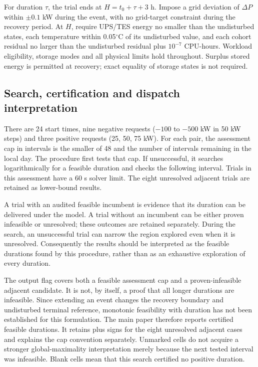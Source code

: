 For duration $\tau$, the trial ends at $H=t_0+\tau+3$ h. Impose a grid deviation of $\Delta P$ within $\pm0.1$ kW during the event, with no grid-target constraint during the recovery period. At $H$, require UPS/TES energy no smaller than the undisturbed states, each temperature within 0.05$^{\circ}$C of its undisturbed value, and each cohort residual no larger than the undisturbed residual plus $10^{-7}$ CPU-hours. Workload eligibility, storage modes and all physical limits hold throughout. Surplus stored energy is permitted at recovery; exact equality of storage states is not required.

\subsection{Search, certification and dispatch interpretation}
There are 24 start times, nine negative requests ($-100$ to $-500$ kW in 50 kW steps) and three positive requests (25, 50, 75 kW). For each pair, the assessment cap in intervals is the smaller of 48 and the number of intervals remaining in the local day. The procedure first tests that cap. If unsuccessful, it searches logarithmically for a feasible duration and checks the following interval. Trials in this assessment have a 60 s solver limit. The eight unresolved adjacent trials are retained as lower-bound results.

A trial with an audited feasible incumbent is evidence that its duration can be delivered under the model. A trial without an incumbent can be either proven infeasible or unresolved; these outcomes are retained separately. During the search, an unsuccessful trial can narrow the region explored even when it is unresolved. Consequently the results should be interpreted as the feasible durations found by this procedure, rather than as an exhaustive exploration of every duration.

The output flag  covers both a feasible assessment cap and a proven-infeasible adjacent candidate. It is not, by itself, a proof that all longer durations are infeasible. Since extending an event changes the recovery boundary and undisturbed terminal reference, monotonic feasibility with duration has not been established for this formulation. The main paper therefore reports certified feasible durations. It retains plus signs for the eight unresolved adjacent cases and explains the cap convention separately. Unmarked cells do not acquire a stronger global-maximality interpretation merely because the next tested interval was infeasible. Blank cells mean that this search certified no positive duration.

